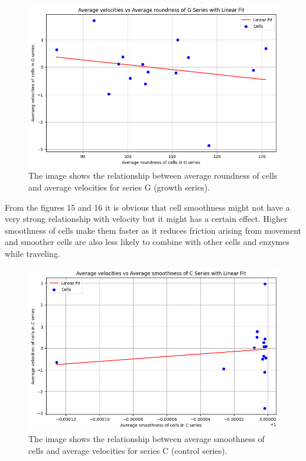 \documentclass{article}
\begin{document}
\begin{figure}[h!]
\centering
\includegraphics[width=0.75\linewidth]{Report/RImages/Graphs/relation_g.png}
\caption{\label{fig:Mean_Distance}The image shows the relationship between average roundness of cells and average velocities for series G (growth series).}
\end{figure}
\clearpage
\newpage

From the figures 15 and 16 it is obvious that cell smoothness might not have a very strong relationship with velocity but it might has a certain effect. Higher smoothness of cells make them faster as it reduces friction arising from movement and smoother cells are also less likely to combine with other cells and enzymes while traveling. 

\begin{figure}[h!]
\centering
\includegraphics[width=0.75\linewidth]{Report/RImages/Graphs/relationship_s.png}
\caption{\label{fig:Mean_Distance}The image shows the relationship between average smoothness of cells and average velocities for series C (control series).}
\end{figure}
\end{document}
